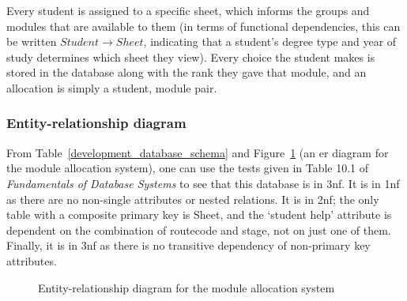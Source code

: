 Every student is assigned to a specific sheet, which informs the groups and
modules that are available to them (in terms of functional dependencies, this
can be written $Student \rightarrow Sheet$, indicating that a student's degree
type and year of study determines which sheet they view). Every choice the
student makes is stored in the database along with the rank they gave that
module, and an allocation is simply a student, module pair.

\subsubsection{Entity-relationship diagram}

From Table~\ref{development_database_schema} and Figure~\ref{er_diagram} (an
\gls{er} diagram for the module allocation system), one can use the tests
given in Table 10.1 of \emph{Fundamentals of Database Systems}
\cite{ElmasriFundamentals_2004} to see that this database is in \gls{3nf}. It
is in \gls{1nf} as there are no non-single attributes or nested relations. It
is in \gls{2nf}; the only table with a composite primary key is Sheet, and the
`student help' attribute is dependent on the combination of \gls{routecode}
and \gls{stage}, not on just one of them. Finally, it is in \gls{3nf} as there
is no transitive dependency of non-primary key attributes.

\begin{landscape}
  \begin{figure}
    \centering
    \caption{Entity-relationship diagram for the module allocation system}
    \label{er_diagram}
  \end{figure}
\end{landscape}
